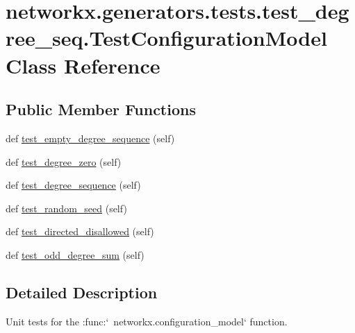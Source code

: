 \hypertarget{classnetworkx_1_1generators_1_1tests_1_1test__degree__seq_1_1TestConfigurationModel}{}\section{networkx.\+generators.\+tests.\+test\+\_\+degree\+\_\+seq.\+Test\+Configuration\+Model Class Reference}
\label{classnetworkx_1_1generators_1_1tests_1_1test__degree__seq_1_1TestConfigurationModel}
\subsection*{Public Member Functions}
\begin{DoxyCompactItemize}
\item 
def \hyperlink{classnetworkx_1_1generators_1_1tests_1_1test__degree__seq_1_1TestConfigurationModel_abe0da8b2f2d957f63b83e998d64dbb36}{test\+\_\+empty\+\_\+degree\+\_\+sequence} (self)
\item 
def \hyperlink{classnetworkx_1_1generators_1_1tests_1_1test__degree__seq_1_1TestConfigurationModel_a0407d675dbe86c55afb0f99a14ade422}{test\+\_\+degree\+\_\+zero} (self)
\item 
def \hyperlink{classnetworkx_1_1generators_1_1tests_1_1test__degree__seq_1_1TestConfigurationModel_a98298e67b1107c2fd2170dcb80fc9c3e}{test\+\_\+degree\+\_\+sequence} (self)
\item 
def \hyperlink{classnetworkx_1_1generators_1_1tests_1_1test__degree__seq_1_1TestConfigurationModel_a829096c3a8c29e1902832c6a3c4f9fff}{test\+\_\+random\+\_\+seed} (self)
\item 
def \hyperlink{classnetworkx_1_1generators_1_1tests_1_1test__degree__seq_1_1TestConfigurationModel_a044dc1bc68ee7950a1153938aeb30693}{test\+\_\+directed\+\_\+disallowed} (self)
\item 
def \hyperlink{classnetworkx_1_1generators_1_1tests_1_1test__degree__seq_1_1TestConfigurationModel_aa32bd7011a846d3c2e3299c871fc62b9}{test\+\_\+odd\+\_\+degree\+\_\+sum} (self)
\end{DoxyCompactItemize}


\subsection{Detailed Description}
\begin{DoxyVerb}Unit tests for the :func:`~networkx.configuration_model`
function.\end{DoxyVerb}
 

